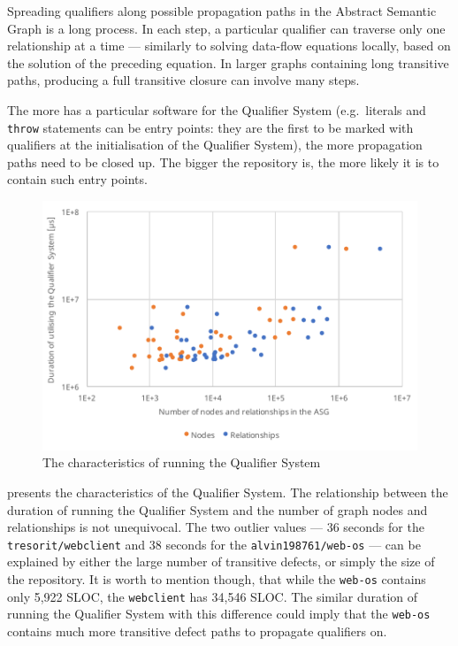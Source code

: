 Spreading qualifiers along possible propagation paths in the Abstract Semantic Graph is a long process. In each step, a particular qualifier can traverse only one relationship at a time — similarly to solving data-flow equations locally, based on the solution of the preceding equation. In larger graphs containing long transitive paths, producing a full transitive closure can involve many steps.

The more  has a particular software for the Qualifier System (e.g.\ literals and \lstinline{throw} statements can be entry points: they are the first to be marked with qualifiers at the initialisation of the Qualifier System), the more propagation paths need to be closed up. The bigger the repository is, the more likely it is to contain such entry points.

\begin{figure}[!htb]
	\centerfloat
	\includegraphics[width=\textwidth,clip]{figures/measurement-qualifiersystem-nodes-relationships.pdf}
	\caption{The characteristics of running the Qualifier System}
	\label{fig:measurement-qualifiersystem-nodes-relationships}
\end{figure}

 presents the characteristics of the Qualifier System. The relationship between the duration of running the Qualifier System and the number of graph nodes and relationships is not unequivocal. The two outlier values — 36 seconds for the \lstinline{tresorit/webclient} and 38 seconds for the \lstinline{alvin198761/web-os} — can be explained by either the large number of transitive defects, or simply the size of the repository. It is worth to mention though, that while the \lstinline{web-os} contains only 5,922 SLOC, the \lstinline{webclient} has 34,546 SLOC. The similar duration of running the Qualifier System with this difference could imply that the \lstinline{web-os} contains much more transitive defect paths to propagate qualifiers on.


